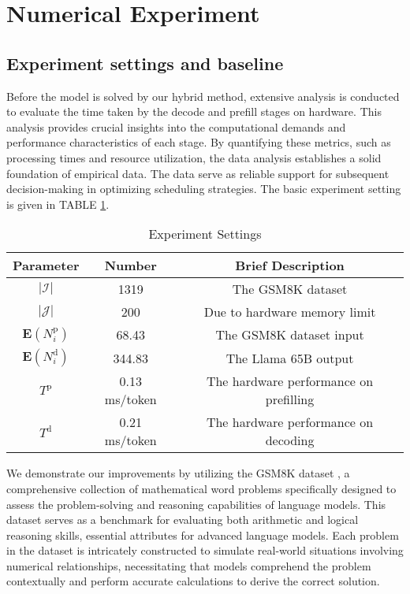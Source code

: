 \section{Numerical Experiment}
\label{numerical-experiment}
\subsection{Experiment settings and baseline}
Before the model is solved by our hybrid method, extensive analysis is conducted to evaluate the time taken by the decode and prefill stages on hardware. This analysis provides crucial insights into the computational demands and performance characteristics of each stage. By quantifying these metrics, such as processing times and resource utilization, the data analysis establishes a solid foundation of empirical data. The data serve as reliable support for subsequent decision-making in optimizing scheduling strategies. The basic experiment setting is given in TABLE \ref{Experiment Settings}.


\begin{table}
    \centering
    \caption{Experiment Settings}
    \begin{tabular}{ccc}
    \toprule
    Parameter     & Number & Brief Description\\
    \midrule
    $|\mathcal{I}|$     & 1319 & The GSM8K dataset \\
    $|\mathcal{J}|$     & 200 & Due to hardware memory limit\\
    $\mathbf{E}(N_i^\text{p})$     & 68.43 & The GSM8K dataset input\\
    $\mathbf{E}(N_i^\text{d})$     & 344.83 & The Llama 65B output\\
    $T^\text{p}$     & 0.13 ms/token & The hardware performance on prefilling\\
    $T^\text{d}$     & 0.21 ms/token & The hardware performance on decoding\\
    \bottomrule

    \end{tabular}
    \label{Experiment Settings}
\end{table}

We demonstrate our improvements by utilizing the GSM8K dataset \cite{cobbe2021training}, a comprehensive collection of mathematical word problems specifically designed to assess the problem-solving and reasoning capabilities of language models. This dataset serves as a benchmark for evaluating both arithmetic and logical reasoning skills, essential attributes for advanced language models. Each problem in the dataset is intricately constructed to simulate real-world situations involving numerical relationships, necessitating that models comprehend the problem contextually and perform accurate calculations to derive the correct solution.

